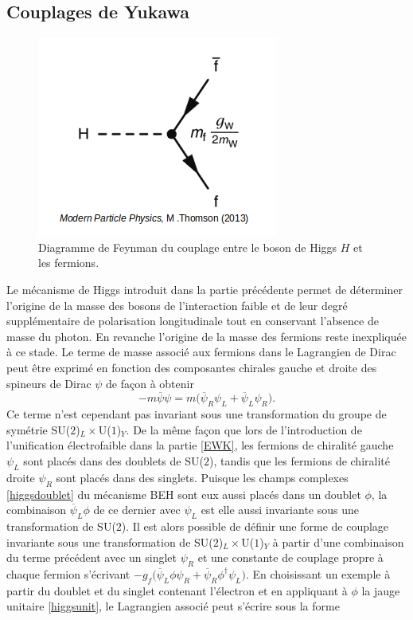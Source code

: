         \subsection{Couplages de Yukawa}
        \label{yukawa}

        \begin{figure}
        \centering
            \includegraphics[scale=0.45]{Chapitre2/Images/higgsfcoupling.png} 
            \caption{Diagramme de Feynman du couplage entre le boson de Higgs $H$ et les fermions.}
        \label{higgsfcoupling}
        \end{figure}

        Le mécanisme de Higgs introduit dans la partie précédente permet de déterminer l'origine de la masse des bosons de l'interaction faible et de leur degré supplémentaire de polarisation longitudinale tout en conservant l'absence de masse du photon. En revanche l'origine de la masse des fermions reste inexpliquée à ce stade. Le terme de masse associé aux fermions dans le Lagrangien de Dirac peut être exprimé en fonction des composantes chirales gauche et droite des spineurs de Dirac $\psi$ de façon à obtenir $$-m\overline{\psi}\psi=m\bigl(\overline{\psi}_R\psi_L+\overline{\psi}_L\psi_R\bigr).$$ Ce terme n'est cependant pas invariant sous une transformation du groupe de symétrie SU($2$)$_L\times$U($1$)$_Y$. De la même façon que lors de l'introduction de l'unification électrofaible dans la partie \ref{EWK}, les fermions de chiralité gauche $\psi_L$ sont placés dans des doublets de SU($2$), tandis que les fermions de chiralité droite $\psi_R$ sont placés dans des singlets. Puisque les champs complexes \ref{higgsdoublet} du mécanisme BEH sont eux aussi placés dans un doublet $\phi$, la combinaison $\overline{\psi}_L\phi$ de ce dernier avec $\psi_L$ est elle aussi invariante sous une transformation de SU($2$). Il est alors possible de définir une forme de couplage invariante sous une transformation de SU($2$)$_L\times$U($1$)$_Y$ à partir d'une combinaison du terme précédent avec un singlet $\psi_R$ et une constante de couplage propre à chaque fermion s'écrivant $-g_f\bigl(\overline{\psi}_L\phi\psi_R+\overline{\psi}_R\phi^{\dag}\psi_L\bigr)$. En choisissant un exemple à partir du doublet et du singlet contenant l'électron et en appliquant à $\phi$ la jauge unitaire \ref{higgsunit}, le Lagrangien associé peut s'écrire sous la forme


